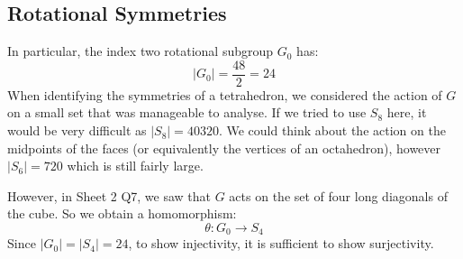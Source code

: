 \documentclass[../main.tex]{subfiles}
\begin{document}
\subsection{Rotational Symmetries}
In particular, the index two rotational subgroup $G_0$ has:
\[
  |G_0| = \frac{48}{2} = 24
\]
When identifying the symmetries of a tetrahedron, we considered the action of $G$ on a small set that was manageable to analyse.
If we tried to use $S_8$ here, it would be very difficult as $|S_8| = 40320$.
We could think about the action on the midpoints of the faces (or equivalently the vertices of an octahedron), however $|S_6| = 720$ which is still fairly large.

However, in Sheet 2 Q7, we saw that $G$ acts on the set of four long diagonals of the cube.
So we obtain a homomorphism:
\[
  \theta: G_0 \to S_4
\]
Since $|G_0| = |S_4| = 24$, to show injectivity, it is sufficient to show surjectivity.
\end{document}
